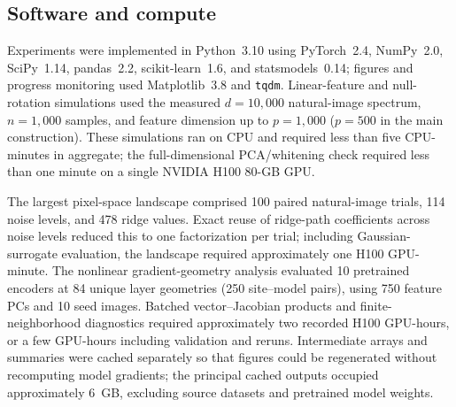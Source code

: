 \subsection{Software and compute}
\label{sec:app-methods-compute}
Experiments were implemented in Python~3.10 using PyTorch~2.4,
NumPy~2.0, SciPy~1.14, pandas~2.2, scikit-learn~1.6, and
statsmodels~0.14; figures and progress monitoring used Matplotlib~3.8 and
\texttt{tqdm}.  Linear-feature and null-rotation simulations used the measured
$d=10{,}000$ natural-image spectrum, $n=1{,}000$ samples, and feature dimension
up to $p=1{,}000$ ($p=500$ in the main construction).  These simulations ran
on CPU and required less than five CPU-minutes in aggregate; the
full-dimensional PCA/whitening check required less than one minute on a single
NVIDIA H100 80-GB GPU.

The largest pixel-space landscape comprised 100 paired natural-image
trials, 114 noise levels, and 478 ridge values.  Exact reuse of ridge-path
coefficients across noise levels reduced this to one factorization per trial;
including Gaussian-surrogate evaluation, the landscape required approximately
one H100 GPU-minute.  The nonlinear gradient-geometry analysis evaluated 10
pretrained encoders at 84 unique layer geometries (250 site--model pairs),
using 750 feature PCs and 10 seed images.  Batched vector--Jacobian products
and finite-neighborhood diagnostics required approximately two recorded H100
GPU-hours, or a few GPU-hours including validation and reruns.  Intermediate
arrays and summaries were cached separately so that figures could
be regenerated without recomputing model gradients; the principal cached
outputs occupied approximately 6~GB, excluding source datasets and pretrained
model weights.
